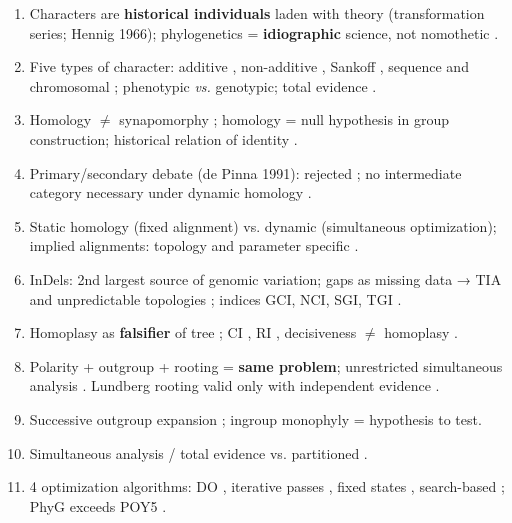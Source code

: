 \clearpage
\begin{revise}\small
\begin{enumerate}[itemsep=0pt, topsep=0pt, parsep=0pt]
    \item Characters are \textbf{historical individuals} laden with theory (transformation series; Hennig 1966); phylogenetics = \textbf{idiographic} science, not nomothetic \parencite{grant2004ts,popper1959}.
    \item Five types of character: additive \parencite{farris1970}, non-additive \parencite{fitch1971}, Sankoff \parencite{sankoff1975}, sequence and chromosomal \parencite{wheeleretal2006}; phenotypic \textit{vs.} genotypic; total evidence \parencite{kluge1989}.
    \item Homology $\neq$ synapomorphy \parencite{nixon2012}; homology = null hypothesis in group construction; historical relation of identity \parencite{grant2004ts}.
    \item Primary/secondary debate (de Pinna 1991): rejected \parencite{wheeleretal2006,grant2004ts}; no intermediate category necessary under dynamic homology \parencite{wheeler2001a,wheeler2001b}.
    \item Static homology (fixed alignment) vs. dynamic (simultaneous optimization); implied alignments: topology and parameter specific \parencite{wheeler2003a}.
    \item InDels: 2nd largest source of genomic variation; gaps as missing data → TIA and unpredictable topologies \parencite{jacobmachado2021c}; indices GCI, NCI, SGI, TGI \parencite{jacobmachado2021c}.
    \item Homoplasy as \textbf{falsifier} of tree \parencite{farris1983,kluge2009}; CI \parencite{klugeanfarris1969}, RI \parencite{farris1989}, decisiveness $\neq$ homoplasy \parencite{goloboff1991}.
    \item Polarity + outgroup + rooting = \textbf{same problem}; unrestricted simultaneous analysis \parencite{nixon1993}. Lundberg rooting valid only with independent evidence \parencite{nixon1993}.
    \item Successive outgroup expansion \parencite{grant2019}; ingroup monophyly = hypothesis to test.
    \item Simultaneous analysis / total evidence \parencite{kluge1989,nixon1996} vs. partitioned \parencite{grantkluge2003}.
    \item 4 optimization algorithms: DO \parencite{wheeler1996}, iterative passes \parencite{wheeler2003b}, fixed states \parencite{wheeler1999a}, search-based \parencite{wheeler2003c}; PhyG exceeds POY5 \parencite{wheeleretal2024,varonwheeler2012}.

\end{enumerate}
\end{revise}
